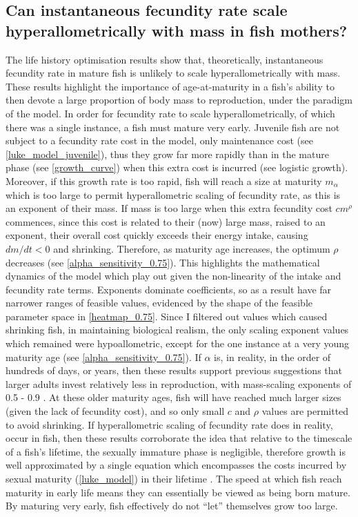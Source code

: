 \documentclass[a4paper]{article} %
\begin{document}
\subsection{Can instantaneous fecundity rate scale hyperallometrically with mass in fish mothers?}
The life history optimisation results show that, theoretically, instantaneous fecundity rate in mature fish is unlikely to scale hyperallometrically with mass. These results highlight the importance of age-at-maturity in a fish's ability to then devote a large proportion of body mass to reproduction, under the paradigm of the model. In order for fecundity rate to scale hyperallometrically, of which there was a single instance, a fish must mature very early. Juvenile fish are not subject to a fecundity rate cost in the model, only maintenance cost (see \cref{luke_model_juvenile}), thus they grow far more rapidly than in the mature phase (see \cref{growth_curve}) when this extra cost is incurred (see logistic growth). Moreover, if this growth rate is too rapid, fish will reach a size at maturity $m_{\alpha}$ which is too large \autocite{Arendt2011} to permit hyperallometric scaling of fecundity rate, as this is an exponent of their mass. If mass is too large when this extra fecundity cost $cm^{\rho}$ commences, since this cost is related to their (now) large mass, raised to an exponent, their overall cost quickly exceeds their energy intake, causing $dm/dt < 0$ and shrinking. Therefore, as maturity age increases, the optimum $\rho$ decreases (see \cref{alpha_sensitivity_0.75}). This highlights the mathematical dynamics of the model which play out given the non-linearity of the intake and fecundity rate terms. Exponents dominate coefficients, so as a result have far narrower ranges of feasible values, evidenced by the shape of the feasible parameter space in \cref{heatmap_0.75}. Since I filtered out values which caused shrinking fish, in maintaining biological realism, the only scaling exponent values which remained were hypoallometric, except for the one instance at a very young maturity age (see \cref{alpha_sensitivity_0.75}). If $\alpha$ is, in reality, in the order of hundreds of days, or years, then these results support previous suggestions that larger adults invest relatively less in reproduction, with mass-scaling exponents of 0.5 - 0.9 \autocite{Reiss1985, Stearns2000}. At these older maturity ages, fish will have reached much larger sizes (given the lack of fecundity cost), and so only small $c$ and $\rho$ values are permitted to avoid shrinking. If hyperallometric scaling of fecundity rate does in reality, occur in fish, then these results corroborate the idea that relative to the timescale of a fish's lifetime, the sexually immature phase is negligible, therefore growth is well approximated by a single equation which encompasses the costs incurred by sexual maturity (\cref{luke_model}) in their lifetime \autocite{West2001}. The speed at which fish reach maturity in early life means they can essentially be viewed as being born mature. By maturing very early, fish effectively do not ``let'' themselves grow too large.
\end{document}
